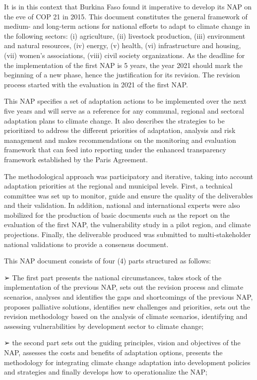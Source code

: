 \documentclass[
]{book}
\begin{document}
It is in this context that Burkina Faso found it imperative to develop its NAP on the eve of COP 21 in 2015. This document constitutes the general framework of medium- and long-term actions for national efforts to adapt to climate change in the following sectors: (i) agriculture, (ii) livestock production, (iii) environment and natural resources, (iv) energy, (v) health, (vi) infrastructure and housing, (vii) women's associations, (viii) civil society organizations. As the deadline for the implementation of the first NAP is 5 years, the year 2021 should mark the beginning of a new phase, hence the justification for its revision. The revision process started with the evaluation in 2021 of the first NAP.

This NAP specifies a set of adaptation actions to be implemented over the next five years and will serve as a reference for any communal, regional and sectoral adaptation plans to climate change. It also describes the strategies to be prioritized to address the different priorities of adaptation, analysis and risk management and makes recommendations on the monitoring and evaluation framework that can feed into reporting under the enhanced transparency framework established by the Paris Agreement.

The methodological approach was participatory and iterative, taking into account adaptation priorities at the regional and municipal levels. First, a technical committee was set up to monitor, guide and ensure the quality of the deliverables and their validation. In addition, national and international experts were also mobilized for the production of basic documents such as the report on the evaluation of the first NAP, the vulnerability study in a pilot region, and climate projections. Finally, the deliverable produced was submitted to multi-stakeholder national validations to provide a consensus document.

This NAP document consists of four (4) parts structured as follows:

➢ The first part presents the national circumstances, takes stock of the implementation of the previous NAP, sets out the revision process and climate scenarios, analyses and identifies the gaps and shortcomings of the previous NAP, proposes palliative solutions, identifies new challenges and priorities, sets out the revision methodology based on the analysis of climate scenarios, identifying and assessing vulnerabilities by development sector to climate change;

➢ the second part sets out the guiding principles, vision and objectives of the NAP, assesses the costs and benefits of adaptation options, presents the methodology for integrating climate change adaptation into development policies and strategies and finally develops how to operationalize the NAP;
\end{document}

